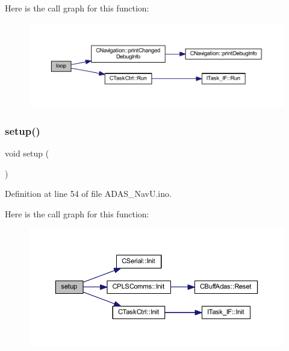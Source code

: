 Here is the call graph for this function\+:\nopagebreak
\begin{figure}[H]
\begin{center}
\leavevmode
\includegraphics[width=350pt]{_a_d_a_s___nav_u_8ino_afe461d27b9c48d5921c00d521181f12f_cgraph}
\end{center}
\end{figure}
\mbox{\label{_a_d_a_s___nav_u_8ino_a4fc01d736fe50cf5b977f755b675f11d}} 
\subsubsection{\texorpdfstring{setup()}{setup()}}
{\footnotesize\ttfamily void setup (\begin{DoxyParamCaption}{ }\end{DoxyParamCaption})}



Definition at line 54 of file A\+D\+A\+S\+\_\+\+Nav\+U.\+ino.

Here is the call graph for this function\+:
\nopagebreak
\begin{figure}[H]
\begin{center}
\leavevmode
\includegraphics[width=350pt]{_a_d_a_s___nav_u_8ino_a4fc01d736fe50cf5b977f755b675f11d_cgraph}
\end{center}
\end{figure}


